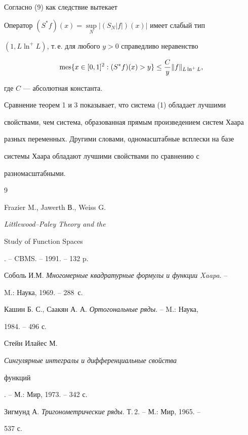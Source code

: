  


Согласно (9) как следствие вытекает 


 


\begin{thm} 


Оператор $(S^*f)(x)=\sup\limits_N|(S_N|f|)(x)|$ имеет слабый тип 


$(1,L\ln^+L)$, т.\,е. для любого $y>0$ справедливо неравенство 


$$ 


\mes\{x\in[0,1]^2:(S^*f)(x)>y\}\le 


\frac{C}{y}\|f\|_{L\ln^+L}, 


$$ 


где $C$ --- абсолютная константа. 


\end{thm} 


 


Сравнение теорем 1 и 3 показывает, что система (1) обладает лучшими 


свойствами, чем система, образованная прямым произведением систем Хаара 


разных переменных. Другими словами, одномасштабные всплески на базе 


системы Хаара обладают лучшими свойствами по сравнению с 


разномасштабными. 


 


\begin{thebibliography}{9} 


 




Frazier M., Jawerth В., Weiss G. {\em Littlewood--Paley Theory and the 


Study of Function Spaces}. -- CBMS. -- 1991. -- 132 p. 


\bibitem{} 


Соболь И.М. {\em Многомерные квадратурные формулы и функции Xaapa}. -- 


M.: Наука, 1969. -- 288~с. 




Кашин Б. С., Саакян А. А. {\em Ортогональные ряды}. -- M.: Наука, 


1984. -- 496 с. 




Стейн Илайес М. {\em Сингулярные интегралы и дифференциальные свойства 


функций}. -- М.: Мир, 1973. -- 342 с. 




Зигмунд А. {\em Тригонометрические ряды}. Т.\,2. -- М.: Мир, 1965. -- 


537 с. 


 


\end{thebibliography} 


